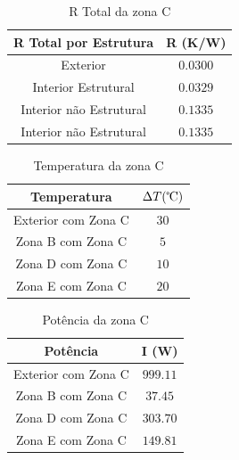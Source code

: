 \documentclass[12pt, a4paper]{article}
\begin{document}
\vspace{15mm}

\begin{table}[htpb]
	\begin{center}
		\begin{tabular}{c c}
			\toprule
			R Total por Estrutura									 & 	R (K/W)  \\
			\midrule
			 Exterior			               				     & $0.0300$		 \\
			 Interior Estrutural             	   			 & $0.0329$		 \\
			 Interior n\~ao Estrutural          		 & $0.1335$		 \\
			 Interior n\~ao Estrutural          		 & $0.1335$		 \\
			\bottomrule
		\end{tabular}
	\end{center}
	\caption{R Total da zona C}\label{tab:seccaoCtotal}
\end{table}

\vspace{15mm}

\begin{table}[htpb]
	\begin{center}
		\begin{tabular}{c c}
			\toprule
			Temperatura    										 & 	$\Delta T(\celsius)$    \\
			\midrule
			 Exterior	com Zona C		               	     & $30$	 \\
			 Zona B com Zona C             	   			 & $5$		 \\
			 Zona D com Zona C          					 & $10$		 \\
			 Zona E com Zona C          					 & $20$		 \\
			\bottomrule
		\end{tabular}
	\end{center}
	\caption{Temperatura da zona C}\label{tab:seccaoCtemp}
\end{table}

\pagebreak

\begin{table}[htpb]
	\begin{center}
		\begin{tabular}{c c}
			\toprule
			Potência   										 & 	I (W) \\
			\midrule
			 Exterior	com Zona C		               	     & $999.11$	 \\
			 Zona B com Zona C             	   			 & $37.45$		 \\
			 Zona D com Zona C          					 & $303.70$		 \\
			 Zona E com Zona C          					 & $149.81$		 \\
			\bottomrule
		\end{tabular}
	\end{center}
	\caption{Potência da zona C}\label{tab:1seccaoCpot}
\end{table}
\end{document}
